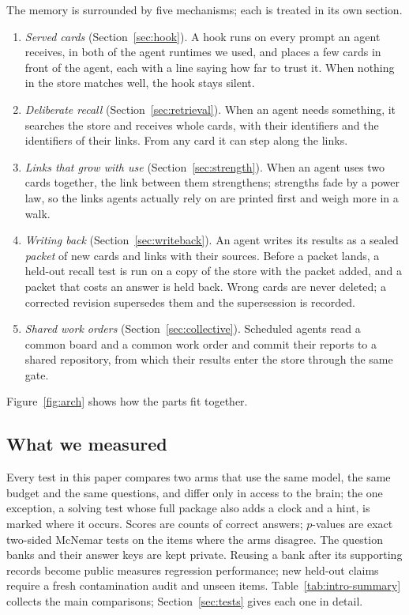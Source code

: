 The memory is surrounded by five mechanisms; each is treated in its own section.

\begin{enumerate}[label=(\roman*)]
\item \emph{Served cards} (Section~\ref{sec:hook}). A hook runs on every prompt an agent receives, in both of the agent runtimes we used, and places a few cards in front of the agent, each with a line saying how far to trust it. When nothing in the store matches well, the hook stays silent.
\item \emph{Deliberate recall} (Section~\ref{sec:retrieval}). When an agent needs something, it searches the store and receives whole cards, with their identifiers and the identifiers of their links. From any card it can step along the links.
\item \emph{Links that grow with use} (Section~\ref{sec:strength}). When an agent uses two cards together, the link between them strengthens; strengths fade by a power law, so the links agents actually rely on are printed first and weigh more in a walk.
\item \emph{Writing back} (Section~\ref{sec:writeback}). An agent writes its results as a sealed \emph{packet} of new cards and links with their sources. Before a packet lands, a held-out recall test is run on a copy of the store with the packet added, and a packet that costs an answer is held back. Wrong cards are never deleted; a corrected revision supersedes them and the supersession is recorded.
\item \emph{Shared work orders} (Section~\ref{sec:collective}). Scheduled agents read a common board and a common work order and commit their reports to a shared repository, from which their results enter the store through the same gate.
\end{enumerate}
Figure~\ref{fig:arch} shows how the parts fit together.



\subsection{What we measured}

Every test in this paper compares two arms that use the same model, the same budget and the same questions, and differ only in access to the brain; the one exception, a solving test whose full package also adds a clock and a hint, is marked where it occurs. Scores are counts of correct answers; $p$-values are exact two-sided McNemar tests on the items where the arms disagree. The question banks and their answer keys are kept private. Reusing a bank after its supporting records become public measures regression performance; new held-out claims require a fresh contamination audit and unseen items. Table~\ref{tab:intro-summary} collects the main comparisons; Section~\ref{sec:tests} gives each one in detail.

